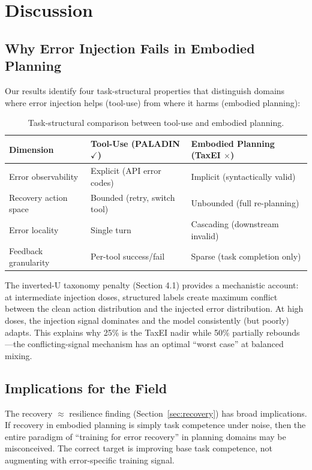 \documentclass[11pt,a4paper]{article}
\begin{document}
\section{Discussion}

\subsection{Why Error Injection Fails in Embodied Planning}

Our results identify four task-structural properties that distinguish domains where error injection helps (tool-use) from where it harms (embodied planning):

\begin{table}[h]
\centering
\caption{Task-structural comparison between tool-use and embodied planning.}
\label{tab:structural}
\begin{tabular}{lll}
\toprule
Dimension & Tool-Use (PALADIN $\checkmark$) & Embodied Planning (TaxEI $\times$) \\
\midrule
Error observability & Explicit (API error codes) & Implicit (syntactically valid) \\
Recovery action space & Bounded (retry, switch tool) & Unbounded (full re-planning) \\
Error locality & Single turn & Cascading (downstream invalid) \\
Feedback granularity & Per-tool success/fail & Sparse (task completion only) \\
\bottomrule
\end{tabular}
\end{table}

The inverted-U taxonomy penalty (Section 4.1) provides a mechanistic account: at intermediate injection doses, structured labels create maximum conflict between the clean action distribution and the injected error distribution. At high doses, the injection signal dominates and the model consistently (but poorly) adapts. This explains why 25\% is the TaxEI nadir while 50\% partially rebounds---the conflicting-signal mechanism has an optimal ``worst case'' at balanced mixing.

\subsection{Implications for the Field}

The recovery $\approx$ resilience finding (Section~\ref{sec:recovery}) has broad implications. If recovery in embodied planning is simply task competence under noise, then the entire paradigm of ``training for error recovery'' in planning domains may be misconceived. The correct target is improving base task competence, not augmenting with error-specific training signal.
\end{document}
